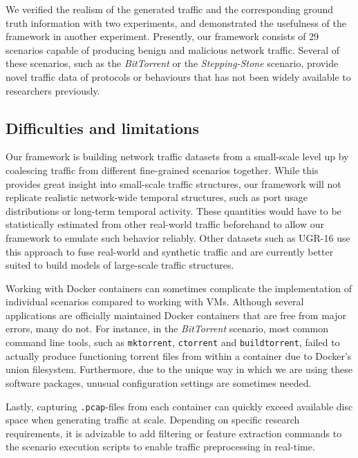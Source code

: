 We verified the realism of the generated traffic and the corresponding ground truth information with two experiments, and demonstrated the usefulness of the framework in another experiment.
Presently, our framework consists of 29 scenarios capable of producing benign and malicious network traffic. Several of these scenarios, such as the \emph{BitTorrent} or the \emph{Stepping-Stone} scenario, provide novel traffic data of protocols or behaviours that has not been widely available to researchers previously.


\subsection{Difficulties and limitations}

Our framework is building network traffic datasets from a small-scale level up by coalescing traffic from different fine-grained scenarios together. While this provides great insight into small-scale traffic structures, our framework will not replicate realistic network-wide temporal structures, such as port usage distributions or long-term temporal activity. These quantities would have to be statistically estimated from other real-world traffic beforehand to allow our framework to emulate such behavior reliably. Other datasets such as UGR-16 use this approach to fuse real-world and synthetic traffic and are currently better suited to build models of large-scale traffic structures.

Working with Docker containers can sometimes complicate the implementation of individual scenarios compared to working with VMs. Although several applications are officially maintained Docker containers that are free from major errors, many do not. For instance, in the \textit{BitTorrent} scenario, most common command line tools, such as \texttt{mktorrent}, \texttt{ctorrent} and \texttt{buildtorrent}, failed to actually produce functioning torrent files from within a container due to Docker's union filesystem. Furthermore, due to the unique way in which we are using these software packages, unusual configuration settings are sometimes needed. %

Lastly, capturing \texttt{.pcap}-files from each container can quickly exceed available disc space when generating traffic at scale. Depending on specific research requirements, it is advizable to add filtering or feature extraction commands to the scenario execution scripts to enable traffic preprocessing in real-time.


